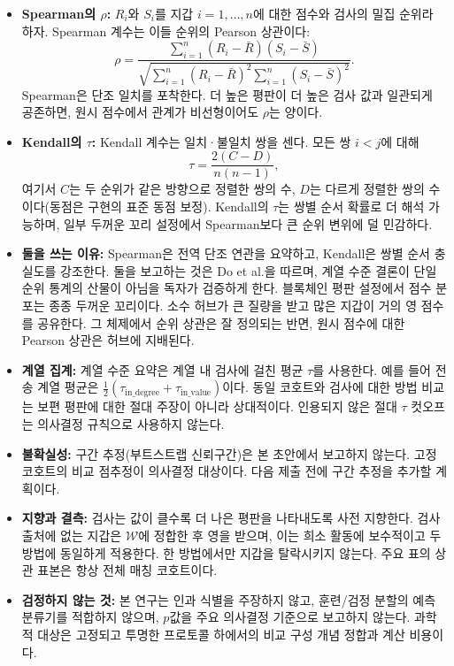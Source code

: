 \begin{itemize}
\item \textbf{Spearman의 $\rho$:} $R_i$와 $S_i$를 지갑 $i=1,\ldots,n$에 대한 점수와 검사의 밀집 순위라 하자. Spearman 계수는 이들 순위의 Pearson 상관이다:
\begin{equation}
\label{eq:spearman-ops}
\rho
=
\frac{\sum_{i=1}^{n}(R_i-\bar R)(S_i-\bar S)}
{\sqrt{\sum_{i=1}^{n}(R_i-\bar R)^2\sum_{i=1}^{n}(S_i-\bar S)^2}}.
\end{equation}
Spearman은 단조 일치를 포착한다. 더 높은 평판이 더 높은 검사 값과 일관되게 공존하면, 원시 점수에서 관계가 비선형이어도 $\rho$는 양이다.

\item \textbf{Kendall의 $\tau$:} Kendall 계수는 일치·불일치 쌍을 센다. 모든 쌍 $i<j$에 대해
\begin{equation}
\label{eq:kendall-ops}
\tau
=
\frac{2(C-D)}{n(n-1)},
\end{equation}
여기서 $C$는 두 순위가 같은 방향으로 정렬한 쌍의 수, $D$는 다르게 정렬한 쌍의 수이다(동점은 구현의 표준 동점 보정). Kendall의 $\tau$는 쌍별 순서 확률로 더 해석 가능하며, 일부 두꺼운 꼬리 설정에서 Spearman보다 큰 순위 변위에 덜 민감하다.

\item \textbf{둘을 쓰는 이유:} Spearman은 전역 단조 연관을 요약하고, Kendall은 쌍별 순서 충실도를 강조한다. 둘을 보고하는 것은 Do et al.을 따르며, 계열 수준 결론이 단일 순위 통계의 산물이 아님을 독자가 검증하게 한다. 블록체인 평판 설정에서 점수 분포는 종종 두꺼운 꼬리이다. 소수 허브가 큰 질량을 받고 많은 지갑이 거의 영 점수를 공유한다. 그 체제에서 순위 상관은 잘 정의되는 반면, 원시 점수에 대한 Pearson 상관은 허브에 지배된다.

\item \textbf{계열 집계:} 계열 수준 요약은 계열 내 검사에 걸친 평균 $\tau$를 사용한다. 예를 들어 전송 계열 평균은 $\tfrac{1}{2}(\tau_{\mathrm{in\_degree}}+\tau_{\mathrm{in\_value}})$이다. 동일 코호트와 검사에 대한 방법 비교는 보편 평판에 대한 절대 주장이 아니라 상대적이다. 인용되지 않은 절대 $\tau$ 컷오프는 의사결정 규칙으로 사용하지 않는다.

\item \textbf{불확실성:} 구간 추정(부트스트랩 신뢰구간)은 본 초안에서 보고하지 않는다. 고정 코호트의 비교 점추정이 의사결정 대상이다. 다음 제출 전에 구간 추정을 추가할 계획이다.

\item \textbf{지향과 결측:} 검사는 값이 클수록 더 나은 평판을 나타내도록 사전 지향한다. 검사 출처에 없는 지갑은 $\mathcal{W}$에 정합한 후 영을 받으며, 이는 희소 활동에 보수적이고 두 방법에 동일하게 적용한다. 한 방법에서만 지갑을 탈락시키지 않는다. 주요 표의 상관 표본은 항상 전체 매칭 코호트이다.

\item \textbf{검정하지 않는 것:} 본 연구는 인과 식별을 주장하지 않고, 훈련/검정 분할의 예측 분류기를 적합하지 않으며, $p$값을 주요 의사결정 기준으로 보고하지 않는다. 과학적 대상은 고정되고 투명한 프로토콜 하에서의 비교 구성 개념 정합과 계산 비용이다.

\end{itemize}

